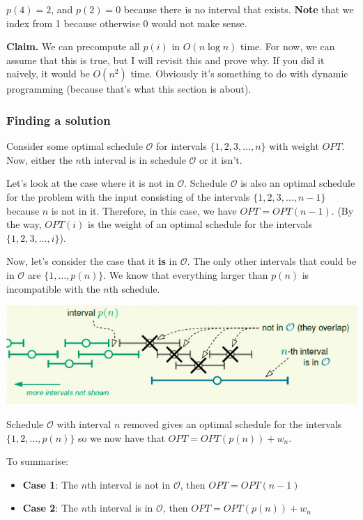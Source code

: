 \documentclass[11pt,a4paper,titlepage,dvipsnames,cmyk]{scrartcl}
\begin{document}
$p(4) = 2$, and $p(2) = 0$ because there is no interval that exists.
\textbf{Note} that we index from 1 because otherwise 0 would not make
sense.

\textbf{Claim.} We can precompute all $p(i)$ in $O(n \log n)$ time. For
now, we can assume that this is true, but I will revisit this and prove
why. If you did it naively, it would be $O(n^2)$ time. Obviously it's
something to do with dynamic programming (because that's what this section
is about).

\subsubsection{Finding a solution}%
\label{ssub:solution-dynamic}
Consider some optimal schedule $\mathcal{O}$ for intervals $\{1, 2, 3,
\dots, n\}$ with weight $OPT$. Now, either the $n$th interval is in
schedule $\mathcal{O}$ or it isn't.

Let's look at the case where it is not in $\mathcal{O}$. Schedule
$\mathcal{O}$ is also an optimal schedule for the problem with the input
consisting of the intervals $\{1, 2, 3, \dots, n-1\}$ because $n$ is not in
it. Therefore, in this case, we have $OPT = OPT(n-1)$. (By the way,
$OPT(i)$ is the weight of an optimal schedule for the intervals $\{1,
2, 3, \dots, i\}$).

Now, let's consider the case that it \textbf{is} in $\mathcal{O}$. The
only other intervals that could be in $\mathcal{O}$ are $\{1, \dots,
p(n)\}$. We know that everything larger than $p(n)$ is incompatible with
the $n$th schedule.

\begin{center}
    \includegraphics[scale=.5]{weight-n-sched.png}
\end{center}

Schedule $\mathcal{O}$ with interval $n$ removed gives an optimal schedule
for the intervals $\{1, 2, \dots, p(n) \}$ so we now have that $OPT =
OPT(p(n)) + w_n$.

To summarise:
\begin{itemize}
    \item \textbf{Case 1}: The $n$th interval is not in $\mathcal{O}$,
        then $OPT = OPT(n-1)$
    \item \textbf{Case 2}: The $n$th interval is in $\mathcal{O}$, then
        $OPT = OPT(p(n)) + w_n$
\end{itemize}
\end{document}
